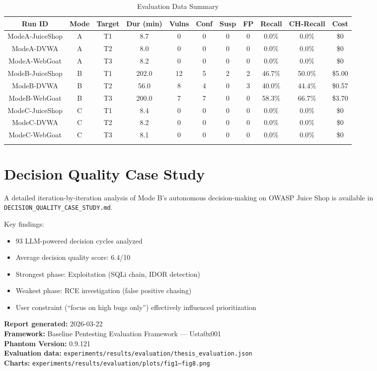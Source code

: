 \documentclass[12pt,a4paper,oneside]{book}
\begin{document}
\begin{longtable}{|c|c|c|c|c|c|c|c|c|c|c|}
\hline
\textbf{Run ID} & \textbf{Mode} & \textbf{Target} & \textbf{Dur (min)} & \textbf{Vulns} & \textbf{Conf} & \textbf{Susp} & \textbf{FP} & \textbf{Recall} & \textbf{CH-Recall} & \textbf{Cost} \\ \hline
\endhead
ModeA-JuiceShop & A & T1 & 8.7 & 0 & 0 & 0 & 0 & 0.0\% & 0.0\% & \$0 \\ \hline
ModeA-DVWA & A & T2 & 8.0 & 0 & 0 & 0 & 0 & 0.0\% & 0.0\% & \$0 \\ \hline
ModeA-WebGoat & A & T3 & 8.2 & 0 & 0 & 0 & 0 & 0.0\% & 0.0\% & \$0 \\ \hline
ModeB-JuiceShop & B & T1 & 202.0 & 12 & 5 & 2 & 2 & 46.7\% & 50.0\% & \$5.00 \\ \hline
ModeB-DVWA & B & T2 & 56.0 & 8 & 4 & 0 & 3 & 40.0\% & 44.4\% & \$0.57 \\ \hline
ModeB-WebGoat & B & T3 & 200.0 & 7 & 7 & 0 & 0 & 58.3\% & 66.7\% & \$3.70 \\ \hline
ModeC-JuiceShop & C & T1 & 8.4 & 0 & 0 & 0 & 0 & 0.0\% & 0.0\% & \$0 \\ \hline
ModeC-DVWA & C & T2 & 8.2 & 0 & 0 & 0 & 0 & 0.0\% & 0.0\% & \$0 \\ \hline
ModeC-WebGoat & C & T3 & 8.1 & 0 & 0 & 0 & 0 & 0.0\% & 0.0\% & \$0 \\ \hline
\caption{Evaluation Data Summary}
\label{tab:eval_summary}
\end{longtable}

\chapter{Decision Quality Case Study}

A detailed iteration-by-iteration analysis of Mode B's autonomous decision-making on OWASP Juice Shop is available in \texttt{DECISION\_QUALITY\_CASE\_STUDY.md}.

Key findings:
\begin{itemize}
    \item 93 LLM-powered decision cycles analyzed
    \item Average decision quality score: 6.4/10
    \item Strongest phase: Exploitation (SQLi chain, IDOR detection)
    \item Weakest phase: RCE investigation (false positive chasing)
    \item User constraint (``focus on high bugs only'') effectively influenced prioritization
\end{itemize}

\bigskip

\noindent\textbf{Report generated:} 2026-03-22 \\
\textbf{Framework:} Baseline Pentesting Evaluation Framework — Usta0x001 \\
\textbf{Phantom Version:} 0.9.121 \\
\textbf{Evaluation data:} \texttt{experiments/results/evaluation/thesis\_evaluation.json} \\
\textbf{Charts:} \texttt{experiments/results/evaluation/plots/fig1–fig8.png}
\end{document}
